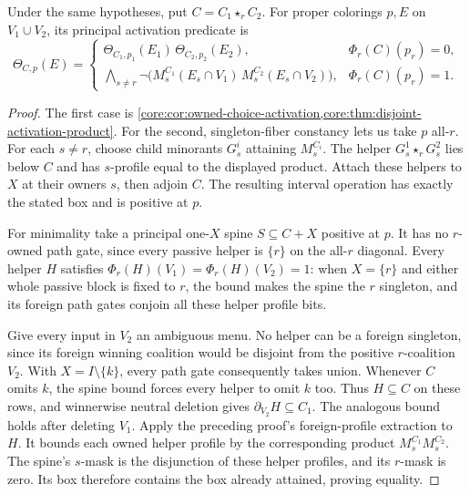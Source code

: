 \begin{theorem}
\label{core:thm:disjoint-owned-activation}
Under the same hypotheses, put $C=C_1\star_r C_2$.
For proper colorings $p,E$ on $V_1\cup V_2$, its principal activation
predicate is
\[
 \Theta_{C,p}(E)=
 \begin{cases}
  \Theta_{C_1,p_1}(E_1)\,\Theta_{C_2,p_2}(E_2),
       &\Phi_r(C)(p_r)=0,\\[2pt]
  \displaystyle\bigwedge_{s\ne r}
       \neg\bigl(M_s^{C_1}(E_s\cap V_1)\,
                 M_s^{C_2}(E_s\cap V_2)\bigr),
       &\Phi_r(C)(p_r)=1.
 \end{cases}
\]
\end{theorem}
\begin{proof}
The first case is \cref{core:cor:owned-choice-activation,core:thm:disjoint-activation-product}.
For the second, singleton-fiber constancy lets us take $p$ all-$r$.
For each $s\ne r$, choose child minorants $G_s^i$ attaining
$M_s^{C_i}$. The helper $G_s^1\star_r G_s^2$ lies below $C$ and
has $s$-profile equal to the displayed product.
Attach these helpers to $X$ at their owners $s$, then adjoin $C$.
The resulting interval operation has exactly the stated box and is
positive at $p$.

For minimality take a principal one-$X$ spine $S\subseteq C+X$
positive at $p$. It has no $r$-owned path gate, since every passive
helper is $\{r\}$ on the all-$r$ diagonal.
Every helper $H$ satisfies
$\Phi_r(H)(V_1)=\Phi_r(H)(V_2)=1$:
when $X=\{r\}$ and either whole passive block is fixed to $r$,
the bound makes the spine the $r$ singleton, and its foreign path
gates conjoin all these helper profile bits.

Give every input in $V_2$ an ambiguous menu. No helper can be a
foreign singleton, since its foreign winning coalition would be
disjoint from the positive $r$-coalition $V_2$.
With $X=I\setminus\{k\}$, every path gate consequently takes union.
Whenever $C$ omits $k$, the spine bound forces every helper to omit
$k$ too. Thus $H\subseteq C$ on these rows, and winnerwise neutral
deletion gives $\partial_{V_2}H\subseteq C_1$.
The analogous bound holds after deleting $V_1$.
Apply the preceding proof's foreign-profile extraction to $H$.
It bounds each owned helper profile by the corresponding product
$M_s^{C_1}M_s^{C_2}$. The spine's $s$-mask is the disjunction of
these helper profiles, and its $r$-mask is zero.
Its box therefore contains the box already attained, proving equality.
\end{proof}

